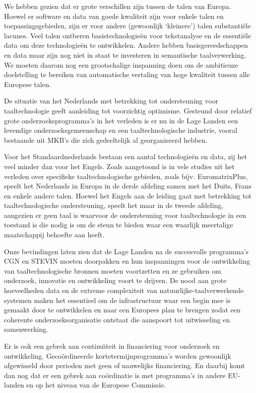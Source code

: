 \documentclass[]{../../metanetpaper}
\begin{document}
\begin{multicols}{2}
    We hebben gezien dat er grote verschillen zijn tussen de talen van Europa. Hoewel er software en data van goede kwaliteit zijn voor enkele talen en toepassingsgebieden, zijn er voor andere (gewoonlijk `kleinere') talen substanti{\"e}le lacunes. Veel talen ontberen basistechnologie{\"e}n voor tekstanalyse en de essenti{\"e}le data om deze technologie{\"e}n te ontwikkelen. Andere hebben basisgereedschappen en data maar zijn nog niet in staat te investeren in semantische taalverwerking. We moeten daarom nog een grootschalige inspanning doen om de ambitieuze doelstelling te bereiken van automatische vertaling van hoge kwaliteit tussen alle Europese talen.

    De situatie van het Nederlands met betrekking tot ondersteuning voor taaltechnologie geeft aanleiding tot voorzichtig optimisme. Gesteund door relatief grote onderzoeksprogramma's in het verleden is er nu in de Lage Landen een levendige onderzoeksgemeenschap en een taaltechnologische industrie, vooral bestaande uit MKB's die zich gedeeltelijk al georganiseerd hebben.

    Voor het Standaardnederlands bestaan een aantal technologie{\"e}n en data, zij het veel minder dan voor het Engels. Zoals aangetoond is in vele studies uit het verleden over specifieke taaltechnologische gebieden, zoals bijv. EuromatrixPlus, speelt het Nederlands in Europa in de derde afdeling samen met het Duits, Frans en enkele andere talen. Hoewel het Engels aan de leiding gaat met betrekking tot taaltechnologische ondersteuning, speelt het  maar in de tweede afdeling, aangezien er geen taal is waarvoor de ondersteuning voor taaltechnologie  in een toestand is die nodig is om de steun te bieden waar een waarlijk meertalige maatschappij behoefte aan heeft.

    Onze bevindingen laten zien dat de Lage Landen na de succesvolle programma's CGN en STEVIN moeten doorpakken en hun inspanningen voor de ontwikkeling van taaltechnologische bronnen moeten voortzetten en ze gebruiken om onderzoek, innovatie en ontwikkeling voort te drijven. De nood aan grote hoeveelheden data en de extreme complexiteit van natuurlijke-taalverwerkende systemen maken het essentieel om de infrastructuur waar een begin mee is gemaakt door te ontwikkelen en naar een Europees plan te brengen zodat een coherente onderzoeksorganisatie ontstaat die aanspoort tot uitwisseling en samenwerking.

    Er is ook een gebrek aan continu{\"\i}teit in financiering voor onderzoek en ontwikkeling. Geco{\"o}rdineerde kortetermijnprogramma's worden gewoonlijk afgewisseld door perioden met geen of nauwelijks financiering. En daarbij komt dan nog dat er een gebrek aan co{\"o}rdinatie is met programma's in andere EU-landen en op het niveau van de Europese Commissie.


\end{multicols}
\end{document}
